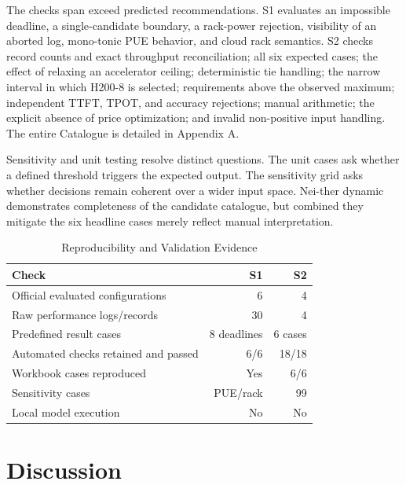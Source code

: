 \documentclass[final,3p,12pt,nopreprintline]{elsarticle}
\begin{document}
The checks span exceed predicted recommendations. S1 evaluates an impossible deadline, a single-candidate boundary, a rack-power rejection, visibility of an aborted log, mono-tonic PUE behavior, and cloud rack semantics. S2 checks record counts and exact throughput reconciliation; all six expected cases; the effect of relaxing an accelerator ceiling; deterministic tie handling; the narrow interval in which H200-8 is selected; requirements above the observed maximum; independent TTFT, TPOT, and accuracy rejections; manual arithmetic; the explicit absence of price optimization; and invalid non-positive input handling. The entire Catalogue is detailed in Appendix A.


Sensitivity and unit testing resolve distinct questions. The unit cases ask whether a defined threshold triggers the expected output. The sensitivity grid asks whether decisions remain coherent over a wider input space. Nei-ther dynamic demonstrates completeness of the candidate catalogue, but combined they mitigate the six headline cases merely reflect manual interpretation.


\begin{table}[htbp]
\caption{Reproducibility and Validation Evidence}
\label{tab:validation}
\centering
\footnotesize
\setlength{\tabcolsep}{3pt}
\renewcommand{\arraystretch}{1.08}
\begin{tabularx}{\columnwidth}{Xrr}
\toprule
\textbf{Check} & \textbf{S1} & \textbf{S2}\\
\midrule
Official evaluated configurations & 6 & 4\\
Raw performance logs/records & 30 & 4\\
Predefined result cases & 8 deadlines & 6 cases\\
Automated checks retained and passed & 6/6 & 18/18\\
Workbook cases reproduced & Yes & 6/6\\
Sensitivity cases & PUE/rack & 99\\
Local model execution & No & No\\
\bottomrule
\end{tabularx}
\end{table}

\section{Discussion}
\end{document}
